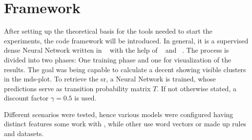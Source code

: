 \chapter{Framework} \label{ch: framework}
After setting up the theoretical basis for the tools needed to start the experiments, the code framework will be introduced. In general, it is a supervised dense Neural Network written in \python{}~\cite{VanRossumEtAl09Python} with the help of \keras{}~\cite{chollet2015keras} and \numpy{}~\cite{harris2020array}. The process is divided into two phases: One training phase and one for visualization of the results. The goal was being capable to calculate a decent \srmat{} showing visible clusters in the \gls{mds}-plot. To retrieve the \gls{sr}, a Neural Network is trained, whose predictions serve as transition probability matrix $ T $. If not otherwise stated, a discount factor $ \gamma = 0.5 $ is used.

Different scenarios were tested, hence various models were configured having distinct features \eg some work with , while other use word vectors or made up rules and datasets.









